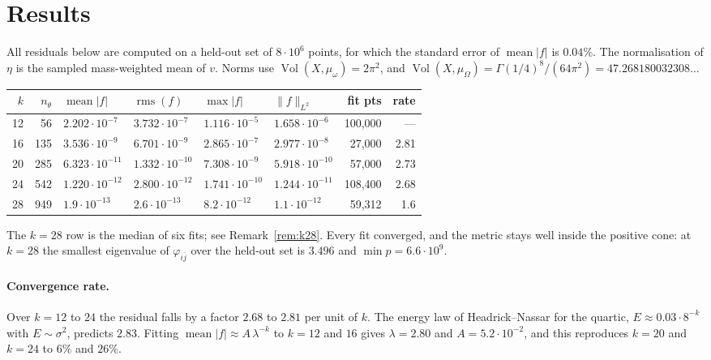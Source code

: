 \documentclass[11pt,a4paper]{article}
\newcommand{\Vol}{\operatorname{Vol}}
\newcommand{\rms}{\operatorname{rms}}
\begin{document}
\section{Results}

All residuals below are computed on a held-out set of $8\cdot10^6$ points, for
which the standard error of $\operatorname{mean}|f|$ is $0.04\%$. The
normalisation of $\eta$ is the sampled mass-weighted mean of $v$. Norms use
$\Vol(X,\mu_\omega)=2\pi^2$, and
$\Vol(X,\mu_\Omega)=\Gamma(1/4)^8/(64\pi^2)=47.268180032308\ldots$

\begin{center}
\begin{tabular}{rrllllrr}
\toprule
$k$ & $n_\theta$ & $\operatorname{mean}|f|$ & $\rms(f)$
    & $\max|f|$ & $\|f\|_{L^2}$ & fit pts & rate\\
\midrule
12 &  56 & $2.202\cdot10^{-7}$  & $3.732\cdot10^{-7}$  & $1.116\cdot10^{-5}$  & $1.658\cdot10^{-6}$  & 100{,}000 & ---\\
16 & 135 & $3.536\cdot10^{-9}$  & $6.701\cdot10^{-9}$  & $2.865\cdot10^{-7}$  & $2.977\cdot10^{-8}$  &  27{,}000 & 2.81\\
20 & 285 & $6.323\cdot10^{-11}$ & $1.332\cdot10^{-10}$ & $7.308\cdot10^{-9}$  & $5.918\cdot10^{-10}$ &  57{,}000 & 2.73\\
24 & 542 & $1.220\cdot10^{-12}$ & $2.800\cdot10^{-12}$ & $1.741\cdot10^{-10}$ & $1.244\cdot10^{-11}$ & 108{,}400 & 2.68\\
28 & 949 & $1.9\cdot10^{-13}$   & $2.6\cdot10^{-13}$   & $8.2\cdot10^{-12}$   & $1.1\cdot10^{-12}$   &  59{,}312 & 1.6\\
\bottomrule
\end{tabular}
\end{center}

\noindent
The $k=28$ row is the median of six fits; see Remark~\ref{rem:k28}. Every fit
converged, and the metric stays well inside the positive cone: at $k=28$ the
smallest eigenvalue of $\varphi_{i\bar j}$ over the held-out set is $3.496$ and
$\min p=6.6\cdot10^{9}$.

\paragraph{Convergence rate.}
Over $k=12$ to $24$ the residual falls by a factor $2.68$ to $2.81$ per unit of
$k$. The energy law of Headrick--Nassar for the quartic, $E\approx0.03\cdot8^{-k}$
with $E\sim\sigma^2$, predicts $2.83$. Fitting
$\operatorname{mean}|f|\approx A\,\lambda^{-k}$ to $k=12$ and $16$ gives
$\lambda=2.80$ and $A=5.2\cdot10^{-2}$, and this reproduces $k=20$ and $k=24$ to
$6\%$ and $26\%$.
\end{document}
